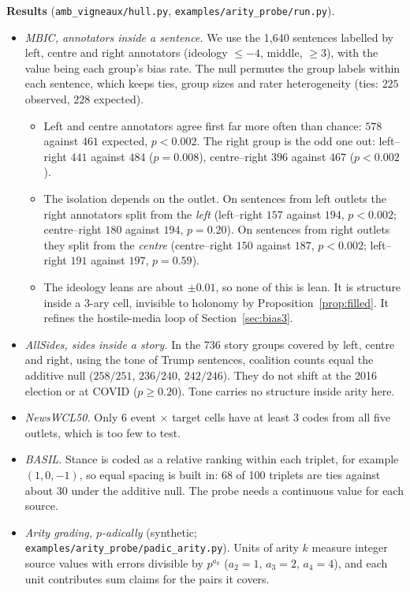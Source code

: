 \documentclass[11pt]{article}
\theoremstyle{definition}
\theoremstyle{remark}
\begin{document}
\textbf{Results} (\texttt{amb\_vigneaux/hull.py}, \texttt{examples/arity\_probe/run.py}).
\begin{itemize}
  \item \emph{MBIC, annotators inside a sentence.} We use the 1{,}640 sentences labelled by left, centre and right annotators (ideology $\le-4$, middle, $\ge3$), with the value being each group's bias rate. The null permutes the group labels within each sentence, which keeps ties, group sizes and rater heterogeneity (ties: $225$ observed, $228$ expected).
    \begin{itemize}
      \item Left and centre annotators agree first far more often than chance: $578$ against $461$ expected, $p<0.002$. The right group is the odd one out: left--right $441$ against $484$ ($p=0.008$), centre--right $396$ against $467$ ($p<0.002$).
      \item The isolation depends on the outlet. On sentences from left outlets the right annotators split from the \emph{left} (left--right $157$ against $194$, $p<0.002$; centre--right $180$ against $194$, $p=0.20$). On sentences from right outlets they split from the \emph{centre} (centre--right $150$ against $187$, $p<0.002$; left--right $191$ against $197$, $p=0.59$).
      \item The ideology leans are about $\pm0.01$, so none of this is lean. It is structure inside a 3-ary cell, invisible to holonomy by Proposition~\ref{prop:filled}. It refines the hostile-media loop of Section~\ref{sec:bias3}.
    \end{itemize}
  \item \emph{AllSides, sides inside a story.} In the 736 story groups covered by left, centre and right, using the tone of Trump sentences, coalition counts equal the additive null ($258/251$, $236/240$, $242/246$). They do not shift at the 2016 election or at COVID ($p\ge0.20$). Tone carries no structure inside arity here.
  \item \emph{NewsWCL50.} Only 6 event $\times$ target cells have at least 3 codes from all five outlets, which is too few to test.
  \item \emph{BASIL.} Stance is coded as a relative ranking within each triplet, for example $(1,0,-1)$, so equal spacing is built in: 68 of 100 triplets are ties against about 30 under the additive null. The probe needs a continuous value for each source.
  \item \emph{Arity grading, $p$-adically} (synthetic; \texttt{examples/arity\_probe/padic\_arity.py}). Units of arity $k$ measure integer source values with errors divisible by $p^{a_k}$ ($a_2=1$, $a_3=2$, $a_4=4$), and each unit contributes sum claims for the pairs it covers.

\end{itemize}
\end{document}
